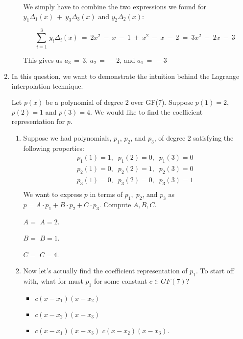 \documentclass[11pt, preview]{standalone} %
\begin{document}
\begin{enumerate}
\begin{enumerate}
\begin{Freeform}{-3}
\Solution We simply have to combine the two expressions we found for $y_1 \Delta_1(x)\ +\ y_3 \Delta_3(x)$ and $y_2 \Delta_2(x)$:

$$\sum_{i = 1}^{3}\, y_i \Delta_i(x)\ =\ 2x^2\ -\ x\ -\ 1\ +\ x^2\ -\ x\ -\ 2\ =\ 3 x^2\ -\ 2x\ -\ 3$$

This gives us $a_3\, =\, 3$, $a_2\, =\, -2$, and $a_1\, =\, -3$
\end{Freeform}

\end{enumerate}

\item In this question, we want to demonstrate the intuition behind the Lagrange interpolation technique.

Let $p(x)$ be a polynomial of degree 2 over GF(7). Suppose $p(1) = 2$, $p(2) = 1$ and $p(3) = 4$. We would like to find the coefficient representation for $p$.
\begin{enumerate}
\item Suppose we had polynomials, $p_1$, $p_2$, and $p_3$, of degree $2$  satisfying the following properties:
\begin{align*}
    p_1(1) = 1, \;\;p_1(2) = 0,\;\;p_1(3)=0\\
    p_2(1) = 0, \;\;p_2(2) = 1,\;\;p_2(3)=0\\
    p_3(1) = 0, \;\;p_3(2) = 0,\;\;p_3(3)=1\\
\end{align*}
We want to express $p$ in terms of $p_1,\;p_2$, and $p_3$ as $p = A \cdot p_1 + B \cdot p_2 + C \cdot p_3$. Compute $A, B, C$.
\begin{Freeform}{2}
$A=$
\Solution $A = 2$. 
\end{Freeform}
\begin{Freeform}{1}
$B=$
\Solution $B = 1$. 
\end{Freeform}
\begin{Freeform}{4}
$C=$
\Solution $C = 4$. 
\end{Freeform}
\item Now let's actually find the coefficient representation of $p_1$. To start off with, what for must $p_1$ for some constant $c \in GF(7)$?
\begin{Choices}
\begin{itemize}
\FalseChoice \item $c(x-x_1)(x-x_2)$
\TrueChoice \item $c(x-x_2)(x-x_3)$
\FalseChoice \item $c(x-x_1)(x-x_3)$
\Solution $c(x-x_2)(x-x_3)$.
\end{itemize}
\end{Choices}


\end{enumerate}
\end{enumerate}
\end{document}

